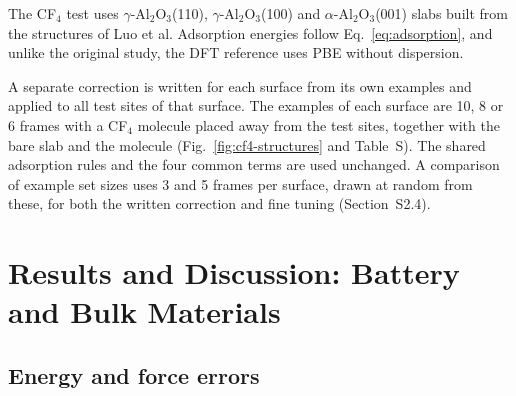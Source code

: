 The CF$_4$ test uses $\gamma$-Al$_2$O$_3$(110), $\gamma$-Al$_2$O$_3$(100) and $\alpha$-Al$_2$O$_3$(001) slabs built from the structures of Luo et al.\cite{luo2024cf4} Adsorption energies follow Eq.~\eqref{eq:adsorption}, and unlike the original study, the DFT reference uses PBE without dispersion.

A separate correction is written for each surface from its own examples and applied to all test sites of that surface. The examples of each surface are 10, 8 or 6 frames with a CF$_4$ molecule placed away from the test sites, together with the bare slab and the molecule (Fig.~\ref{fig:cf4-structures} and Table~S\fi). The shared adsorption rules and the four common terms are used unchanged. A comparison of example set sizes uses 3 and 5 frames per surface, drawn at random from these, for both the written correction and fine tuning (Section~S2.4).

\ifbulk
\section{Results and Discussion: Battery and Bulk Materials}

\subsection{Energy and force errors}

